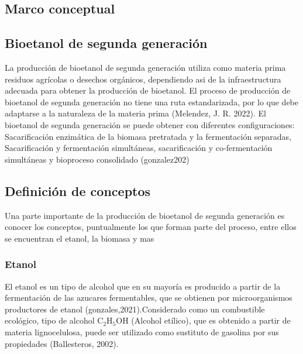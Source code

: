 \documentclass[12pt]{article}
\begin{document}
	   \newpage


\cleardoublepage


\begin{appendix}




		\section{Marco conceptual}
		\label{marco conceptual}
		\subsection{Bioetanol de segunda generación}
		La producción de bioetanol de segunda generación utiliza como materia prima residuos agrícolas o desechos orgánicos, dependiendo asi de la infraestructura adecuada para obtener la producción de bioetanol. El proceso de producción de bioetanol de segunda generación no tiene una ruta estandarizada, por lo que debe adaptarse a la naturaleza de la materia prima \cite{melendez2022biotecnologia} (Melendez, J. R. 2022). El bioetanol de segunda generación se puede obtener con diferentes configuraciones: Sacarificación enzimática de la biomasa pretratada y la fermentación separadas, Sacarificación y fermentación simultáneas, sacarificación y co-fermentación simultáneas y bioproceso consolidado (gonzalez202)
		
		\subsection{Definición de conceptos }
		Una parte  importante de la producción de bioetanol de segunda generación es conocer los conceptos, puntualmente los que forman parte del proceso, entre ellos se encuentran el etanol, la biomasa y mas 
		\subsubsection{Etanol}
		El etanol es un tipo de alcohol que en su mayoría es producido a partir de la  fermentación de las azucares fermentables, que se obtienen por microorganismos productores de etanol \cite{} (gonzales,2021).Considerado como un combustible ecológico, tipo de alcohol $\text{C}_2\text{H}_5\text{OH}$ (Alcohol etílico), que es obtenido a partir de materia lignocelulosa, puede ser utilizado como sustituto de gasolina por sus propiedades (Ballesteros, 2002).
		

\end{appendix}
\end{document}
